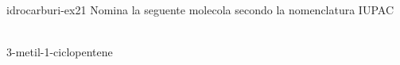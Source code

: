 \documentclass[preview]{standalone}
\begin{document}
\begin{snippetexercise}{idrocarburi-ex21}
    {Nomina la seguente molecola secondo la nomenclatura IUPAC}
    \begin{center}
        \\\vspace{0.25cm}
        3-metil-1-ciclopentene
    \end{center}
\end{snippetexercise}

\end{document}
